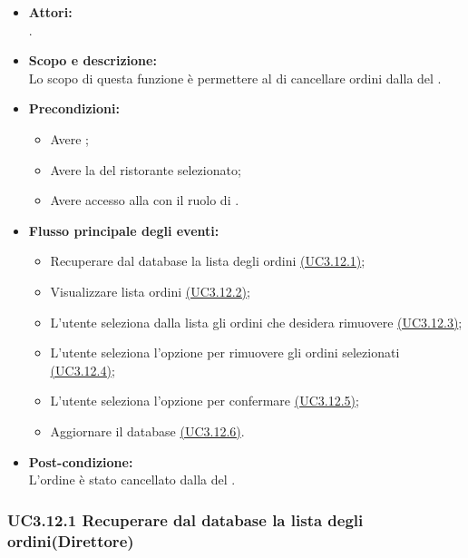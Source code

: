 \begin{itemize}
	\item \textbf{Attori:}
	\\.
	\item \textbf{Scopo e descrizione:} 
	\\Lo scopo di questa funzione è permettere al  di cancellare ordini dalla  del .
	\item \textbf{Precondizioni:}
	\begin{itemize}
		\item Avere ;
		\item Avere la  del ristorante selezionato;
		\item Avere accesso alla  con il ruolo di .
	\end{itemize}
	\item \textbf{Flusso principale degli eventi:}
	\begin{itemize}
		\item Recuperare dal database la lista degli ordini \hyperref[UC3.12.1]{(UC3.12.1)};
		\item Visualizzare lista ordini \hyperref[UC3.12.2]{(UC3.12.2)};
		\item L'utente  seleziona dalla lista gli ordini che desidera rimuovere \hyperref[UC3.12.3]{(UC3.12.3)};
		\item L'utente  seleziona l'opzione per rimuovere gli ordini selezionati \hyperref[UC3.12.4]{(UC3.12.4)};
		\item L'utente  seleziona l'opzione per confermare \hyperref[UC3.12.5]{(UC3.12.5)};
		\item Aggiornare il database \hyperref[UC3.12.6]{(UC3.12.6)}.
	\end{itemize}
	\item \textbf{Post-condizione:}
	\\L'ordine è stato cancellato dalla  del .
\end{itemize}

\subsubsection{UC3.12.1 Recuperare dal database la lista degli ordini(Direttore)} \label{UC3.12.1}

